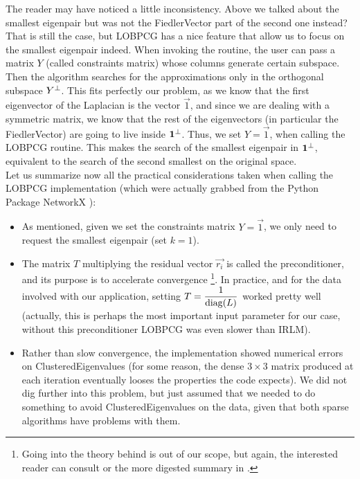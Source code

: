 The reader may have noticed a little inconsistency. Above we talked about
the smallest eigenpair but was not the \gls{FiedlerVector} part of the
second one instead? That is still the case, but \gls{LOBPCG} has a nice
feature that allow us to focus on the smallest eigenpair indeed. When
invoking the routine, the user can pass a matrix $Y$ (called
constraints matrix) whose columns
generate certain subspace. Then the algorithm searches for the
approximations only in the orthogonal subspace ${Y}^{\bot}$. This fits
perfectly our problem, as we know that the first eigenvector of the
\gls{Laplacian} is the vector $\vec{1}$, and since we are dealing with a
symmetric matrix, we know that the rest of the eigenvectors (in
particular the \gls{FiedlerVector}) are going to live inside
${\mathbf{1}}^{\bot}$. Thus, we set $Y = \vec{1}$, when calling the \gls{LOBPCG}
routine. This makes the search of the smallest eigenpair in
${\mathbf{1}}^{\bot}$, equivalent to the search of the second smallest on
the original space. \\

Let us summarize now all the practical considerations taken when
calling the \gls{LOBPCG} implementation (which were actually grabbed from the
Python Package NetworkX \cite{networkx}):

\begin{itemize}
\item As mentioned, given we set the constraints matrix $Y = \vec{1}$,
  we only need to request the smallest eigenpair (set
  $k=1$). 
\item The matrix $T$ multiplying the residual vector $\vec{r_i}$ is called
  the preconditioner, and its purpose is to accelerate
  convergence \footnote{Going into the theory behind is out of
    our scope, but again,  the interested reader can consult \cite{knyazev01}
    or the more digested summary in \cite{lashuk07}.}. In practice, and for the
  data involved with our application, setting $T =
  \dfrac{1}{\operatorname{diag}(L)}$ worked pretty well (actually, this is
  perhaps the most important input parameter for our case, without
  this preconditioner \gls{LOBPCG} was even slower than \gls{IRLM}). 
\item Rather than slow convergence, the implementation showed
  numerical errors on \gls{ClusteredEigenvalues} (for some reason, the
  dense $3 \times 3$ matrix produced at each iteration eventually
  looses the properties the code expects). We did not dig further into
  this problem, but just assumed that we needed to do something to
  avoid \gls{ClusteredEigenvalues} on the data, given that both sparse
  algorithms have problems with them.
\end{itemize}

